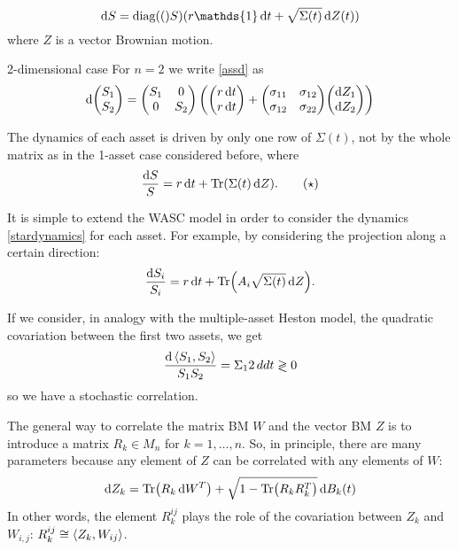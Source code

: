 \begin{equation}\label{assd}
    \dd S = \diag(S)(r\mathds{1}\,\dd t + \sqrt{\Sigma(t)}\,\dd Z(t))
\end{equation}
where $Z$ is a vector Brownian motion.
\begin{example}{2-dimensional case}{}{}
    For $n=2$ we write \eqref{assd} as
    \begin{align*}
        \dd\mqty(S_1 \\ S_2) = \mqty(S_1 & 0 \\ 0 & S_2)\left(\mqty(r\,\dd t \\ r\,\dd t) + \mqty(\sigma_{11} & \sigma_{12} \\ \sigma_{12} & \sigma_{22})\mqty(\dd Z_1 \\ \dd Z_2)\right)
    \end{align*}
\end{example}
\begin{remark}
    The dynamics of each asset is driven by only one row of $\Sigma(t)$, not by the whole matrix as in the 1-asset case considered before, where
    \begin{align}\label{stardynamics}
        \frac{\dd S}{S} = r\,\dd t + \Tr(\Sigma(t)\,\dd Z). \tag{$\star$}
    \end{align}
\end{remark}
\begin{remark}
    It is simple to extend the WASC model in order to consider the dynamics \eqref{stardynamics} for each asset. For example, by considering the projection along a certain direction:
    \begin{align*}
        \dfrac{\dd S_i}{S_i} = r\,\dd t + \Tr(A_i\sqrt{\Sigma(t)}\,\dd Z).
    \end{align*}
\end{remark}
\begin{remark}
    If we consider, in analogy with the multiple-asset Heston model, the quadratic covariation between the first two assets, we get
    \begin{align*}
        \frac{\dd\expval{S_1,S_2}}{S_1S_2} = \Sigma_12 \,dd t \gtrless 0
    \end{align*}
    so we have a stochastic correlation.
\end{remark}
\begin{remark}
    The general way to correlate the matrix BM $W$ and the vector BM $Z$ is to introduce a matrix $R_k\in M_n$ for $k=1,\dots,n$. So, in principle, there are many parameters because any element of $Z$ can be correlated with any elements of $W$:
    \begin{align}
        \dd Z_k = \Tr(R_k\,\dd W^T) + \sqrt{1-\Tr(R_kR_k^T)}\,\dd B_k(t)
    \end{align}
    In other words, the element $R_k^{ij}$ plays the role of the covariation between $Z_k$ and $W_{i,j}$: $R_k^{ij} \cong \expval{Z_k, W_{ij}}$.
\end{remark}
